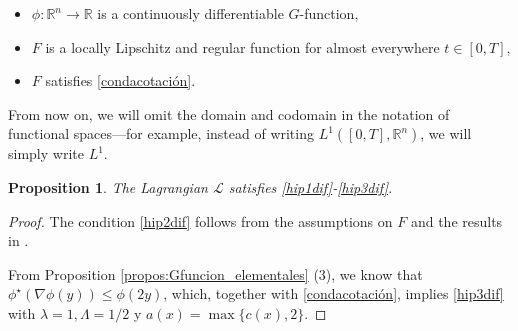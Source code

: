 \documentclass[twoside]{article}
\theoremstyle{definition}
\theoremstyle{plain}
\newtheorem{Propos}[definition]{Proposition}
\theoremstyle{remark}
\begin{document}
\begin{itemize}
 \item $\phi:\mathbb{R}^n \to \mathbb{R}$  is a continuously differentiable $G$-function,
 \item $F$ is a locally Lipschitz and regular function for almost everywhere $t\in [0,T]$,
 \item $F$ satisfies \ref{condacotación}.
\end{itemize}


From now on, we will omit the domain and codomain in the notation of functional spaces—for example, instead of writing $ L^1([0,T], \mathbb{R}^n) $, we will simply write $ L^1 $.



\begin{Propos}\label{ProposAcotación}
The Lagrangian $\mathcal{L}$ satisfies  \ref{hip1dif}-\ref{hip3dif}.
\end{Propos}
\begin{proof}

 The condition \ref{hip2dif} follows from the assumptions on $F$ and the results in \cite[Sec. 10.2]{clarke2013functional}.

 From Proposition \ref{propos:Gfuncion_elementales} (3), we know that  $\phi^\star(\nabla \phi(y))\leq \phi(2y)$, which, together with \ref{condacotación}, implies \ref{hip3dif} with $\lambda=1, \Lambda=1/2$ y $a(x)=\max \{c(x),2\}$. \end{proof}
\end{document}
